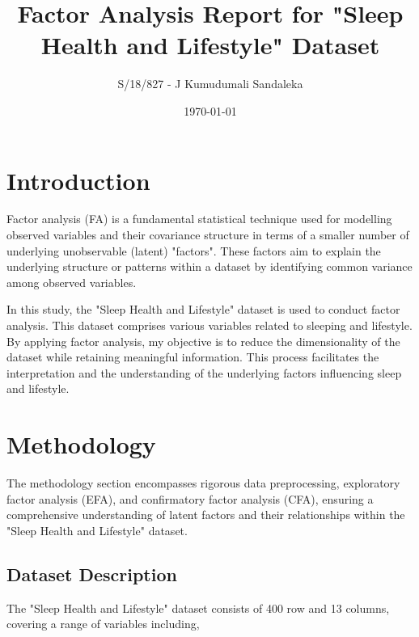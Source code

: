 \documentclass[11pt]{article}
\title{Factor Analysis Report for "Sleep Health and Lifestyle" Dataset}
\author{S/18/827 - J Kumudumali Sandaleka}
\date{\today}
\begin{document}
	
	\maketitle
	\setlength{\parindent}{0pt}
	\setlength{\parskip}{6pt}
	
	\section{Introduction}
		 Factor analysis (FA) is a fundamental statistical technique used for modelling observed variables and their covariance structure in terms of a smaller number of underlying unobservable (latent) "factors". These factors aim to explain the underlying structure or patterns within a dataset by identifying common variance among observed variables. \par 
		 
		 In this study, the "Sleep Health and Lifestyle" dataset is used to conduct factor analysis. This dataset comprises various variables related to sleeping and lifestyle. By applying factor analysis, my objective is to reduce the dimensionality of the dataset while retaining meaningful information. This process facilitates the interpretation and the understanding of the underlying factors influencing sleep and lifestyle.
		 
	\section{Methodology}
	The methodology section encompasses rigorous data preprocessing, exploratory factor analysis (EFA), and confirmatory factor analysis (CFA), ensuring a comprehensive understanding of latent factors and their relationships within the "Sleep Health and Lifestyle" dataset.
	
		\subsection{Dataset Description}
		The "Sleep Health and Lifestyle" dataset consists of 400 row and 13 columns, covering a range of variables including,
		
\end{document}
